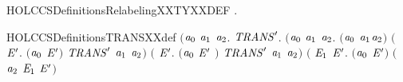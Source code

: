 \newcommand{\HOLCCSDefinitionsRelabelingXXISOXXDEF}{\UseVerbatim{HOLCCSDefinitionsRelabelingXXISOXXDEF}}
\begin{SaveVerbatim}{HOLCCSDefinitionsRelabelingXXTYXXDEF}
\HOLTokenTurnstile{} \HOLSymConst{\HOLTokenExists{}}.   
\end{SaveVerbatim}
\newcommand{\HOLCCSDefinitionsRelabelingXXTYXXDEF}{\UseVerbatim{HOLCCSDefinitionsRelabelingXXTYXXDEF}}
\begin{SaveVerbatim}{HOLCCSDefinitionsTRANSXXdef}
\HOLTokenTurnstile{}  \HOLSymConst{\ensuremath{=}}
   \ensuremath{(}\HOLTokenLambda{}\ensuremath{\HOLBoundVar{a}\sb{\mathrm{0}}} \ensuremath{\HOLBoundVar{a}\sb{\mathrm{1}}} \ensuremath{\HOLBoundVar{a}\sb{\mathrm{2}}}.
        \HOLSymConst{\HOLTokenForall{}}\ensuremath{\HOLBoundVar{TRANS}\sp{\prime}}.
            \ensuremath{(}\HOLSymConst{\HOLTokenForall{}}\ensuremath{\HOLBoundVar{a}\sb{\mathrm{0}}} \ensuremath{\HOLBoundVar{a}\sb{\mathrm{1}}} \ensuremath{\HOLBoundVar{a}\sb{\mathrm{2}}}.
                 \ensuremath{(}\ensuremath{\HOLBoundVar{a}\sb{\mathrm{0}}} \HOLSymConst{\ensuremath{=}} \ensuremath{\HOLBoundVar{a}\sb{\mathrm{1}}}\HOLSymConst{\ensuremath{\ldotp}}\ensuremath{\HOLBoundVar{a}\sb{\mathrm{2}}}\ensuremath{)} \HOLSymConst{\HOLTokenDisj{}}
                 \ensuremath{(}\HOLSymConst{\HOLTokenExists{}} \ensuremath{\HOLBoundVar{E}\sp{\prime}}. \ensuremath{(}\ensuremath{\HOLBoundVar{a}\sb{\mathrm{0}}} \HOLSymConst{\ensuremath{=}}  \HOLSymConst{\ensuremath{+}} \ensuremath{\HOLBoundVar{E}\sp{\prime}}\ensuremath{)} \HOLSymConst{\HOLTokenConj{}} \ensuremath{\HOLBoundVar{TRANS}\sp{\prime}}  \ensuremath{\HOLBoundVar{a}\sb{\mathrm{1}}} \ensuremath{\HOLBoundVar{a}\sb{\mathrm{2}}}\ensuremath{)} \HOLSymConst{\HOLTokenDisj{}}
                 \ensuremath{(}\HOLSymConst{\HOLTokenExists{}} \ensuremath{\HOLBoundVar{E}\sp{\prime}}. \ensuremath{(}\ensuremath{\HOLBoundVar{a}\sb{\mathrm{0}}} \HOLSymConst{\ensuremath{=}} \ensuremath{\HOLBoundVar{E}\sp{\prime}} \HOLSymConst{\ensuremath{+}} \ensuremath{)} \HOLSymConst{\HOLTokenConj{}} \ensuremath{\HOLBoundVar{TRANS}\sp{\prime}}  \ensuremath{\HOLBoundVar{a}\sb{\mathrm{1}}} \ensuremath{\HOLBoundVar{a}\sb{\mathrm{2}}}\ensuremath{)} \HOLSymConst{\HOLTokenDisj{}}
                 \ensuremath{(}\HOLSymConst{\HOLTokenExists{}} \ensuremath{\HOLBoundVar{E}\sb{\mathrm{1}}} \ensuremath{\HOLBoundVar{E}\sp{\prime}}.
                      \ensuremath{(}\ensuremath{\HOLBoundVar{a}\sb{\mathrm{0}}} \HOLSymConst{\ensuremath{=}}  \HOLSymConst{\ensuremath{\mid}} \ensuremath{\HOLBoundVar{E}\sp{\prime}}\ensuremath{)} \HOLSymConst{\HOLTokenConj{}} \ensuremath{(}\ensuremath{\HOLBoundVar{a}\sb{\mathrm{2}}} \HOLSymConst{\ensuremath{=}} \ensuremath{\HOLBoundVar{E}\sb{\mathrm{1}}} \HOLSymConst{\ensuremath{\mid}} \ensuremath{\HOLBoundVar{E}\sp{\prime}}\ensuremath{)} \HOLSymConst{\HOLTokenConj{}}

\end{SaveVerbatim}
